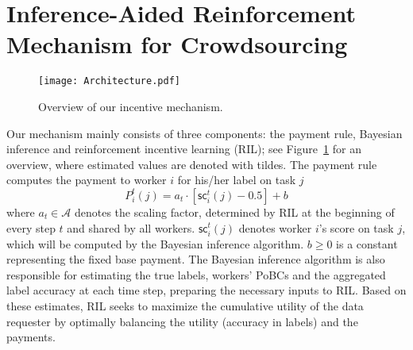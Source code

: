 \documentclass{article}
\newcommand{\com}[1]{\textbf{\color{red}(COMMENT: #1)}} %
\newcommand{\com}[1]{}
\begin{document}
\section{Inference-Aided Reinforcement Mechanism for Crowdsourcing}
\label{section: methodology}
\begin{figure}[!htb]
\centering
\texttt{[image: Architecture.pdf]}
\caption{\label{figure:layout} Overview of our incentive mechanism.}
\end{figure}
Our mechanism mainly consists of three components: the payment rule, Bayesian inference and reinforcement incentive learning (RIL); see Figure~\ref{figure:layout} for an overview, where estimated values are denoted with tildes.
The payment rule computes the payment to worker $i$ for his/her label on task $j$
\begin{equation}
P^t_i(j)=a_t \cdot [\textsf{sc}^{t}_i(j)-0.5]+b
\label{equation:payment}
\end{equation}
where $a_t \in \mathcal{A}$ denotes the scaling factor, determined by RIL at the beginning of every step $t$ and shared by all workers.
$\textsf{sc}^{t}_i(j)$ denotes worker $i$'s score on task $j$, which will be computed by the Bayesian inference algorithm.
$b\geq 0$ is a constant representing the fixed base payment. The Bayesian inference algorithm is also responsible for estimating the true labels, workers' PoBCs and the aggregated label accuracy at each time step, preparing the necessary inputs to RIL. Based on these estimates, RIL seeks to maximize the cumulative utility of the data requester by optimally balancing the utility (accuracy in labels) and the payments.
\end{document}
